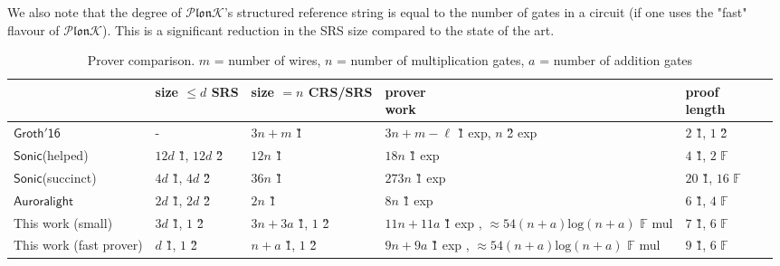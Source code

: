\documentclass[11pt]{article} %
\newcommand{\plonk}{\ensuremath{\mathcal{P} \mathfrak{lon}\mathcal{K}}\xspace}
\newcommand{\F}{\ensuremath{\mathbb F}\xspace}
\newcommand{\sonic}{\ensuremath{\mathsf{Sonic}}\xspace}
\newcommand{\auroralight}{\ensuremath{\mathsf{Auroralight}}\xspace}
\newcommand{\groth}{\ensuremath{\mathsf{Groth'16}}\xspace}
\newcommand{\cmark}{\ding{51}}%
\newcommand{\xmark}{\ding{55}}%
\begin{document}
We also note that the degree of \plonk's structured reference string is equal to the number of gates in a circuit (if one uses the "fast" flavour of \plonk). This is a significant reduction in the SRS size compared to the state of the art.

\begin{table}[!htbp]
	\caption{Prover comparison. $m$ = number of wires, $n$ = number of multiplication gates, $a$ = number of addition gates}
	\centering
\begin{adjustbox}{width=1\textwidth}
	\begin{tabular}{l|l|l|l|l|l|l}
	& \thead{size $\leq d$\\ SRS} & \thead{size $=n$\\ CRS/SRS} & \thead{prover\\ work} & \thead{proof\\ length} & \thead{succinct} & \thead{universal} \\ \hline
		\groth
		        & - & $3n + m$ \G1      & \makecell[l]{$3n + m - \ell$ \G1 exp, \\ $n$ \G2 exp} & $2$ \G1, $1$ \G2 & \cmark & \xmark \\ \hline
		\sonic (helped)    & $12d$ \G1, $12d$ \G2 & $12n$ \G1         &   $18n$ \G1 exp      & $4$ \G1, $2$ $\F$ & \xmark & \cmark \\ \hline
		\sonic (succinct)  & $4d$ \G1, $4d$ \G2             & $36n$ \G1          & $273n$ \G1 exp           & $20$ \G1, $16$ \F & \cmark & \cmark \\ \hline
		\auroralight       & $2d$ \G1, $2d$ \G2   & $2n$ \G1          & $8n$ \G1 exp         & $6$ \G1, $4$ \F & \xmark & \cmark \\ \hline
		This work (small)         & $3d$ \G1, $1$ \G2     & $3n + 3a$ \G1, $1$ \G2 & \makecell[l]{$11n + 11a$ \G1 exp , \\ $\approx54(n+a)\text{log}(n+a)$ \F mul}        & $7$ \G1, $6$ \F & \cmark & \cmark \\ \hline
		This work (fast prover)         & $d$ \G1, $1$ \G2     & $n + a$ \G1, $1$ \G2 & \makecell[l]{$9n + 9a$ \G1 exp , \\ $\approx54(n+a)\text{log}(n+a)$ \F mul}        & $9$ \G1, $6$ \F & \cmark & \cmark \\ \hline
	\end{tabular}
\end{adjustbox}
\label{table:prover-work}
\end{table} \
\end{document}
